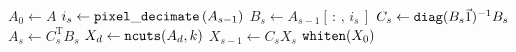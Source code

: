 \documentclass[10pt,journal,cspaper,compsoc]{IEEEtran}
\begin{document}

\begin{algorithm}
\caption{${\tt dncuts}(A, d, k)$}  
\begin{algorithmic}[1]
\State $A_0 \gets A$
\State $i_s \gets {\tt pixel\_decimate}\left( A_{s-1} \right)$
\State $B_s \gets A_{s-1}\left[\,:\,,\, i_s \,\right]$
\State $C_s \gets {\tt diag}( B_s \vec{1} )^{-1} B_s$
\State $A_s \gets C_s^\mathrm{T} B_s$
\EndFor
\State $X_d \gets {\tt ncuts}(A_d, k)$
\State $X_{s-1} \gets C_s X_s$
\EndFor
\State \Return ${\tt whiten}(X_0)$
\end{algorithmic}
\label{alg:dncuts}
\end{algorithm}


\end{document}
